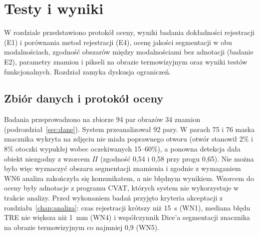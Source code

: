 
\chapter{Testy i wyniki}
\label{chap:testy}

W rozdziale przedstawiono protokół oceny, wyniki badania dokładności rejestracji (E1) i porównania metod rejestracji (E4), ocenę jakości segmentacji w obu modalnościach, zgodność obszarów między modalnościami bez adnotacji (badanie E2), parametry znamion i pikseli na obrazie termowizyjnym oraz wyniki testów funkcjonalnych. Rozdział zamyka dyskusja ograniczeń.

\section{Zbiór danych i protokół oceny}
\label{sec:protokol}

Badania przeprowadzono na zbiorze 94 par obrazów 34 znamion (podrozdział~\ref{sec:dane}). System przeanalizował 92 pary. W parach 75 i 76 maska znacznika wykryta na zdjęciu nie miała poprawnego otworu (otwór stanowił 2\% i 8\% otoczki wypukłej wobec oczekiwanych 15--60\%), a ponowna detekcja dała obiekt niezgodny z wzorcem $\Pi$ (zgodność 0,54 i 0,58 przy progu 0,65). Nie można było więc wyznaczyć obszaru segmentacji znamienia i zgodnie z wymaganiem WN6 analiza zakończyła się komunikatem, a nie błędnym wynikiem. Wzorcem do oceny były adnotacje z programu CVAT, których system nie wykorzystuje w trakcie analizy. Przed wykonaniem badań przyjęto kryteria akceptacji z rozdziału~\ref{chap:analiza}: czas rejestracji krótszy niż 15~s (WN1), mediana błędu TRE nie większa niż 1~mm (WN4) i współczynnik Dice'a segmentacji znacznika na obrazie termowizyjnym co najmniej 0,9 (WN5).

